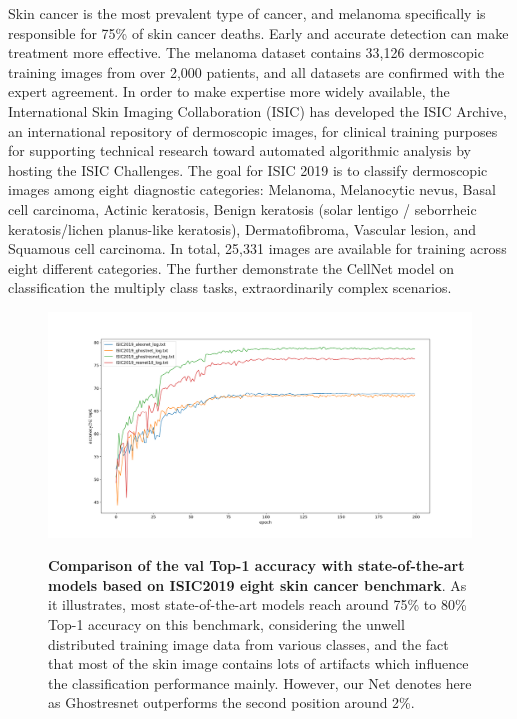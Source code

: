 Skin cancer is the most prevalent type of cancer, and melanoma specifically is responsible for 75\% of skin cancer deaths. Early and accurate detection can make treatment more effective. The melanoma dataset\cite{melanoma} contains 33,126 dermoscopic training images from over 2,000 patients, and all datasets are confirmed with the expert agreement. In order to make expertise more widely available, the International Skin Imaging Collaboration (ISIC)\cite{ISIC2}  has developed the ISIC Archive, an international repository of dermoscopic images, for clinical training purposes for supporting technical research toward automated algorithmic analysis by hosting the ISIC Challenges.
The goal for ISIC 2019\cite{ISIC2} is to classify dermoscopic images among eight diagnostic categories: Melanoma, Melanocytic nevus, Basal cell carcinoma, Actinic keratosis, Benign keratosis (solar lentigo / seborrheic keratosis/lichen planus-like keratosis), Dermatofibroma, Vascular lesion, and Squamous cell carcinoma. In total, 25,331 images are available for training across eight different categories. The \eg{} \eg{} further demonstrate the CellNet model on classification the multiply class tasks, extraordinarily complex scenarios.

\begin{figure}[t]
\includegraphics[height=0.4\textheight,width=1\textwidth]{thesis-template-master/images/top1acc.png}
\label{fig:cellnet}
\caption{ \textbf{Comparison of the val Top-1 accuracy with state-of-the-art models based on ISIC2019 eight skin cancer benchmark\cite{ISIC2}}. As it illustrates, most state-of-the-art models reach around 75\% to 80\% Top-1 accuracy on this benchmark, considering the unwell distributed training image data from various classes, and the fact that most of the skin image contains lots of artifacts which influence the classification performance mainly. However, our Net denotes here as Ghostresnet outperforms the second position around 2\%.}
\label{fig:6.9}
\end{figure}





